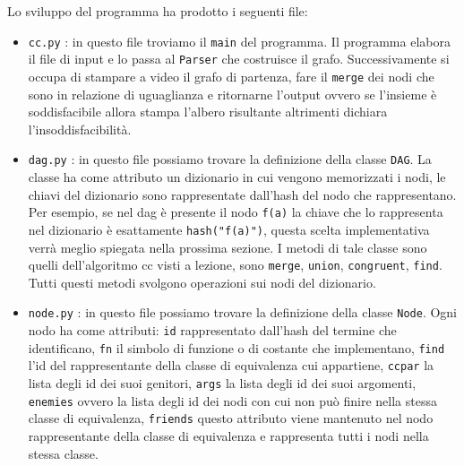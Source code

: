 \documentclass[a4paper, 11pt]{article}
\begin{document}
Lo sviluppo del programma ha prodotto i seguenti file:
\begin{itemize}
\item \verb|cc.py| : in questo file troviamo il \verb|main| del programma. Il programma elabora il file di input e lo passa al \verb|Parser| che costruisce il grafo. Successivamente si occupa di stampare a video il grafo di partenza, fare il \verb|merge| dei nodi che sono in relazione di uguaglianza e ritornarne l'output ovvero se l'insieme è soddisfacibile allora stampa l'albero risultante altrimenti dichiara l'insoddisfacibilità.
\item \verb|dag.py| : in questo file possiamo trovare la definizione della classe \verb|DAG|. La classe ha come attributo un dizionario in cui vengono memorizzati i nodi, le chiavi del dizionario sono rappresentate dall'hash del nodo che rappresentano. Per esempio, se nel dag è presente il nodo \verb|f(a)| la chiave che lo rappresenta nel dizionario è esattamente \verb|hash("f(a)")|, questa scelta implementativa verrà meglio spiegata nella prossima sezione. I metodi di tale classe sono quelli dell'algoritmo cc visti a lezione, sono \verb|merge|, \verb|union|, \verb|congruent|, \verb|find|. Tutti questi metodi svolgono operazioni sui nodi del dizionario. 
\item \verb|node.py| : in questo file possiamo trovare la definizione della classe \verb|Node|. Ogni nodo ha come attributi: \verb|id| rappresentato dall'hash del termine che identificano, \verb|fn| il simbolo di funzione o di costante che implementano, \verb|find| l'id del rappresentante della classe di equivalenza cui appartiene, \verb|ccpar| la lista degli id dei suoi genitori, \verb|args| la lista degli id dei suoi argomenti, \verb|enemies| ovvero la lista degli id dei nodi con cui non può finire nella stessa classe di equivalenza, \verb|friends| questo attributo viene mantenuto nel nodo rappresentante della classe di equivalenza e rappresenta tutti i nodi nella stessa classe.

\end{itemize}
\end{document}
